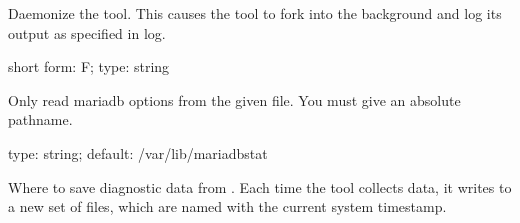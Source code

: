 \documentclass[letterpaper,10pt,english]{sphinxmanual}
\begin{document}

\begin{fulllineitems}
\label{\detokenize{mariadb-stat:cmdoption-mariadb-stat-daemonize}}
Daemonize the tool.  This causes the tool to fork into the background and log
its output as specified in \textendash{}log.

\end{fulllineitems}


\begin{fulllineitems}
\label{\detokenize{mariadb-stat:cmdoption-mariadb-stat-defaults-file}}
short form: \sphinxhyphen{}F; type: string

Only read mariadb options from the given file.  You must give an absolute
pathname.

\end{fulllineitems}


\begin{fulllineitems}
\label{\detokenize{mariadb-stat:cmdoption-mariadb-stat-dest}}
type: string; default: /var/lib/mariadb\sphinxhyphen{}stat

Where to save diagnostic data from {\hyperref[\detokenize{mariadb-stat:cmdoption-mariadb-stat-collect}]{}}.  Each time the tool
collects data, it writes to a new set of files, which are named with the
current system timestamp.

\end{fulllineitems}
\end{document}

